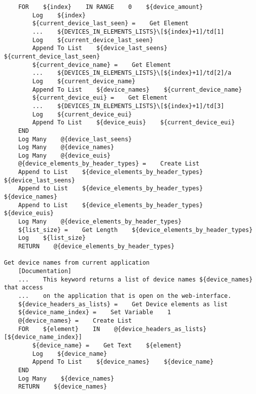 \begin{verbatim}
    FOR    ${index}    IN RANGE    0    ${device_amount}
        Log    ${index}
        ${current_device_last_seen} =    Get Element
        ...    ${DEVICES_IN_ELEMENTS_LISTS}\[${index}+1]/td[1]
        Log    ${current_device_last_seen}
        Append To List    ${device_last_seens}    ${current_device_last_seen}
        ${current_device_name} =    Get Element
        ...    ${DEVICES_IN_ELEMENTS_LISTS}\[${index}+1]/td[2]/a
        Log    ${current_device_name}
        Append To List    ${device_names}    ${current_device_name}
        ${current_device_eui} =    Get Element
        ...    ${DEVICES_IN_ELEMENTS_LISTS}\[${index}+1]/td[3]
        Log    ${current_device_eui}
        Append To List    ${device_euis}    ${current_device_eui}
    END
    Log Many    @{device_last_seens}
    Log Many    @{device_names}
    Log Many    @{device_euis}
    @{device_elements_by_header_types} =    Create List
    Append to List    ${device_elements_by_header_types}    ${device_last_seens}
    Append to List    ${device_elements_by_header_types}    ${device_names}
    Append to List    ${device_elements_by_header_types}    ${device_euis}
    Log Many    @{device_elements_by_header_types}
    ${list_size} =    Get Length    ${device_elements_by_header_types}
    Log    ${list_size}
    RETURN    @{device_elements_by_header_types}

Get device names from current application
    [Documentation]
    ...    This keyword returns a list of device names ${device_names} that access
    ...    on the application that is open on the web-interface.
    ${device_headers_as_lists} =    Get Device elements as list
    ${device_name_index} =    Set Variable    1
    @{device_names} =    Create List
    FOR    ${element}    IN    @{device_headers_as_lists}[${device_name_index}]
        ${device_name} =    Get Text    ${element}
        Log    ${device_name}
        Append To List    ${device_names}    ${device_name}
    END
    Log Many    ${device_names}
    RETURN    ${device_names}


\end{verbatim}
